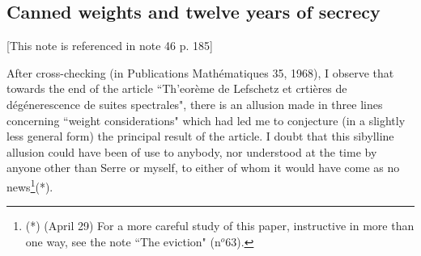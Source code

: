 \subsection{Canned weights and twelve years of secrecy}

\label{note:49} [This note is referenced in note 46 p. 185]

After cross-checking (in Publications Math\'ematiques 35, 1968), I observe that towards the end of the article ``Th'eor\`eme de Lefschetz et crti\`eres de d\'eg\'enerescence de suites spectrales", there is an allusion made in three lines concerning ``weight considerations" which had led me to conjecture (in a slightly less general form) the principal result of the article. I doubt that this sibylline allusion could have been of use to anybody, nor understood at the time by anyone other than Serre or myself, to either of whom it would have come as no news\footnote{(*) (April 29) For a more careful study of this paper, instructive in more than one way, see the note ``The eviction" (n$^o 63$).}(*).

